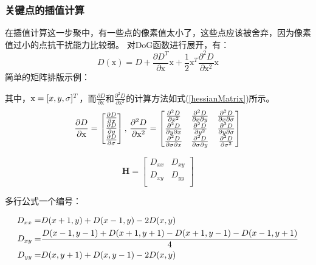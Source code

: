 \documentclass[10.5pt,a4paper]{article}
\numberwithin{equation}{section}
\numberwithin{figure}{section}
\numberwithin{table}{section}
\begin{document}
\subsubsection{关键点的插值计算}
在插值计算这一步聚中，有一些点的像素值太小了，这些点应该被舍弃，因为像素值过小的点抗干扰能力比较弱\cite{lowe2004distinctive}。
对DoG函数进行展开，有：
\begin{equation}
\label{taylorD}
D(\mathrm{x}) = D + \frac{\partial{D}^T }{\partial \mathrm{x}} \mathrm{x} + \frac 12 \mathrm{x}^T \frac{\partial^2D}{\partial \mathrm{x}^2}\mathrm{x}
\end{equation}
简单的矩阵排版示例：\par
其中，$\mathrm{x}=[x,y,\sigma]^T$，而$\frac{\partial D }{\partial\mathrm{x} }$和$\frac{\partial^2 D}{\partial \mathrm{x}^2}$的计算方法如式(\ref{hessianMatrix})所示。
\begin{equation}
\label{hessianMatrix}
\frac{\partial D}{\partial\mathrm{x}} = 
\begin{bmatrix}
\frac{\partial D}{\partial x} \\
\frac{\partial D}{\partial y}  \\
\frac{\partial D}{\partial \sigma}  \\
\end{bmatrix}
,\,
\frac{\partial^2 D}{\partial \mathrm{x}^2} = \begin{bmatrix}
\frac{\partial^2 D}{\partial x^2} &\frac{\partial^2 D}{\partial x\partial y}  &\frac{\partial^2 D}{\partial x\partial\sigma} \\
\frac{\partial^2 D}{\partial y\partial x} &\frac{\partial^2 D}{\partial y^2}  &\frac{\partial^2 D}{\partial y\partial\sigma} \\
\frac{\partial^2 D}{\partial\sigma\partial x} &\frac{\partial^2 D}{\partial\sigma\partial y}  &\frac{\partial^2 D}{\partial\sigma^2} \\
\end{bmatrix}
\end{equation}
\par
\begin{equation}
\mathbf{H} = \begin{bmatrix}
D_{xx}  & D_{xy}\\
D_{xy} & D_{yy}\\
\end{bmatrix}
\end{equation}
\par
多行公式一个编号：\par
\begin{align}
D_{xx}= &D(x+1,y)+D(x-1,y)-2D(x,y) \notag\\
D_{xy}= &\frac{D(x-1,y-1)+D(x+1,y+1)-D(x+1,y-1)-D(x-1,y+1)}{4}\\
D_{yy}= & D(x,y+1)+ D(x,y-1) -2D(x,y) \notag
\end{align}
\end{document}
